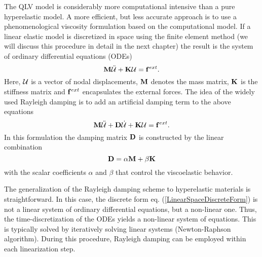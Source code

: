 The QLV model is considerably more computational intensive than a pure hyperelastic model. A more efficient, but less accurate approach is to use a phenomenological viscosity formulation based on the computational model. If a linear elastic model is discretized in space using the finite element method (we will discuss this procedure in detail in the next chapter) the result is the system of ordinary differential equations (ODEs)
 \begin{equation}
\mathbf M \ddot{\mathcal{U} } + \mathbf K \mathcal{U}  = \mathbf f ^{ext}.
\label{LinearSpaceDiscreteForm}
\end{equation}
Here, $\mathcal{U} $ is a vector of nodal displacements, $\mathbf M$ denotes the mass matrix, $\mathbf K$ is the stiffness matrix and $\mathbf f ^{ext}$ encapsulates the external forces. The idea of the widely used Rayleigh damping is to add an artificial damping term to the above equations
 \begin{equation}
\mathbf M \ddot{\mathcal{U} } +  \mathbf D \dot{\mathcal{U} }+ \mathbf K \mathcal{U}  = \mathbf f ^{ext}.
\end{equation}
In this formulation the damping matrix $\mathbf D$ is constructed by the linear combination 
 \begin{equation}
\mathbf D = \alpha \mathbf M+ \beta \mathbf K
\end{equation}
with the scalar coefficients $\alpha$ and $\beta$ that control the viscoelastic behavior. 

The generalization of the Rayleigh damping scheme to hyperelastic materials is straightforward. In this case, the discrete form eq. (\ref{LinearSpaceDiscreteForm}) is not a linear system of ordinary differential equations, but a non-linear one. Thus, the time-discretization of the ODEs yields a non-linear system of equations. This is typically solved by iteratively solving linear systems (Newton-Raphson algorithm). During this procedure, Rayleigh damping can be employed within each linearization step. 

